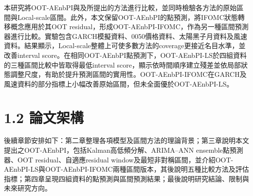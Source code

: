 本研究將OOT-AEnbPI與\cite{hung2026thesis}及\cite{lin2024thesis}所提出的方法進行比較，並同時檢驗各方法的原始區間與Local-scale區間。此外，本文保留OOT-AEnbPI的點預測，將IFOMC狀態轉移概念應用於其OOT residual，形成OOT-AEnbPI-IFOMC，作為另一種區間預測器進行比較。實驗包含GARCH模擬資料、0050價格資料、太陽黑子月資料及風速資料。結果顯示，Local-scale整體上可使多數方法的coverage更接近名目水準，並改善interval score。在相同OOT-AEnbPI點預測下，OOT-AEnbPI-LS於四組資料的三種區間比較中皆取得最低interval score，顯示依時間順序建立殘差並依局部狀態調整尺度，有助於提升預測區間的實用性。OOT-AEnbPI-IFOMC在GARCH及風速資料的部分指標上小幅改善原始區間，但未全面優於OOT-AEnbPI-LS。

\section*{1.2 論文架構}

後續章節安排如下：第二章整理各項模型及區間方法的理論背景；第三章說明本文提出之OOT-AEnbPI，包括Kalman高低頻分解、ARIMA--ANN ensemble點預測器、OOT residual、自適應residual window及最短非對稱區間，並介紹OOT-AEnbPI-LS與OOT-AEnbPI-IFOMC兩種區間版本，其後說明五種比較方法及評估指標；第四章呈現四組資料的點預測與區間預測結果；最後說明研究結論、限制與未來研究方向。
